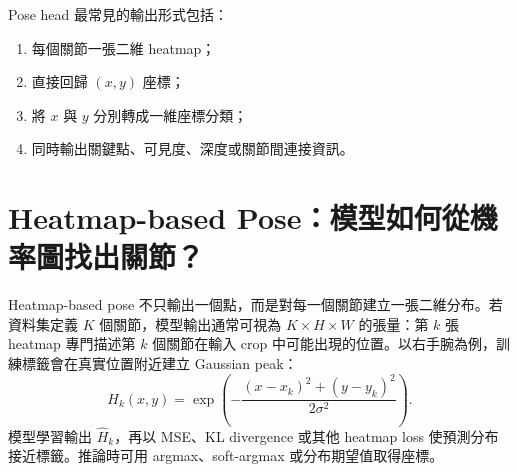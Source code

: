 \documentclass[11pt,a4paper,oneside]{report}
\begin{document}
Pose head 最常見的輸出形式包括：
\begin{enumerate}
  \item 每個關節一張二維 heatmap；
  \item 直接回歸 $(x,y)$ 座標；
  \item 將 $x$ 與 $y$ 分別轉成一維座標分類；
  \item 同時輸出關鍵點、可見度、深度或關節間連接資訊。
\end{enumerate}

\clearpage

\section{Heatmap-based Pose：模型如何從機率圖找出關節？}

Heatmap-based pose 不只輸出一個點，而是對每一個關節建立一張二維分布。若資料集定義 $K$ 個關節，模型輸出通常可視為 $K\times H\times W$ 的張量：第 $k$ 張 heatmap 專門描述第 $k$ 個關節在輸入 crop 中可能出現的位置。以右手腕為例，訓練標籤會在真實位置附近建立 Gaussian peak：
\[
H_k(x,y)=\exp\left(-\frac{(x-x_k)^2+(y-y_k)^2}{2\sigma^2}\right).
\]
模型學習輸出 $\hat H_k$，再以 MSE、KL divergence 或其他 heatmap loss 使預測分布接近標籤。推論時可用 argmax、soft-argmax 或分布期望值取得座標。
\end{document}
